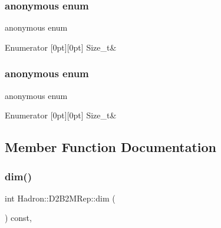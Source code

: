 \subsubsection{\texorpdfstring{anonymous enum}{anonymous enum}}
{\footnotesize\ttfamily anonymous enum}

\begin{DoxyEnumFields}{Enumerator}
[0pt][0pt]{}\mbox{\label{structHadron_1_1D2B2MRep_a3123efadca7d6bb34e8aab0b2626e1a4a5a1447942d01dcc553dae2d6f30fc50b}} 
Size\+\_\+t&\\
\hline

\end{DoxyEnumFields}
\mbox{\label{structHadron_1_1D2B2MRep_a3123efadca7d6bb34e8aab0b2626e1a4}} 
\subsubsection{\texorpdfstring{anonymous enum}{anonymous enum}}
{\footnotesize\ttfamily anonymous enum}

\begin{DoxyEnumFields}{Enumerator}
[0pt][0pt]{}\mbox{\label{structHadron_1_1D2B2MRep_a3123efadca7d6bb34e8aab0b2626e1a4a5a1447942d01dcc553dae2d6f30fc50b}} 
Size\+\_\+t&\\
\hline

\end{DoxyEnumFields}


\subsection{Member Function Documentation}
\mbox{\label{structHadron_1_1D2B2MRep_a5beebf66fecabd7ee94b861df9f607c9}} 
\subsubsection{\texorpdfstring{dim()}{dim()}\hspace{0.1cm}{\footnotesize\ttfamily [1/2]}}
{\footnotesize\ttfamily int Hadron\+::\+D2\+B2\+M\+Rep\+::dim (\begin{DoxyParamCaption}{ }\end{DoxyParamCaption}) const\hspace{0.3cm}{\ttfamily [inline]}, {\ttfamily [virtual]}}

